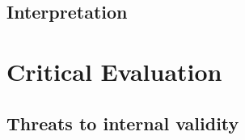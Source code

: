 \documentclass[12pt,a4paper]{article}
\newcommand{\tablenotes}[1]{\par\vspace{4pt}{\footnotesize\textit{Notes:} #1\par}}
\begin{document}




\subsection{Interpretation}



\section{Critical Evaluation}

\subsection{Threats to internal validity}
\end{document}
